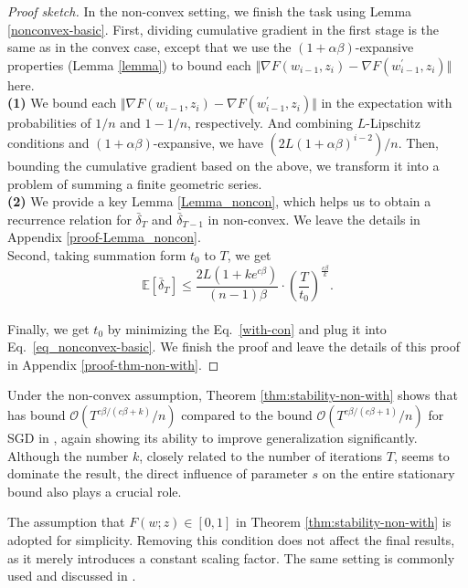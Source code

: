 \begin{proof}[Proof sketch]
In the non-convex setting, we finish the task using Lemma \ref{nonconvex-basic}. First, dividing cumulative gradient in the first stage is the same as in the convex case, except that we use the $(1+\alpha\beta)$-expansive properties (Lemma \ref{lemma}) to bound each $\Vert \nabla F(w_{i-1},z_{i}) - \nabla F(w^{\prime}_{i-1},z_{i}) \Vert$ here. \\
{\bf(1)} We bound each $\Vert \nabla F(w_{i-1},z_{i}) - \nabla F(w^{\prime}_{i-1},z_{i}) \Vert$ in the expectation with probabilities of $1/n$ and $1-1/n$, respectively. And combining $L$-Lipschitz conditions and $(1+\alpha\beta)$-expansive, we have $(2L(1+\alpha\beta)^{i-2})/n$. Then, bounding the cumulative gradient based on the above, we transform it into a problem of summing a finite geometric series. \\
{\bf(2)} We provide a key Lemma \ref{Lemma_noncon}, which helps us to obtain a recurrence relation for $\bar{\delta}_T$ and $\bar{\delta}_{T-1}$ in non-convex. We leave the details in Appendix \ref{proof-Lemma_noncon}. \\
Second, taking summation form $t_0$ to $T$, we get 
\begin{equation*}
 \mathbb{E}\left[\bar{\delta}_{T}\right] \leq \frac{2L(1+ke^{c\beta})}{(n-1)\beta} \cdot \left(\frac{T}{t_0}\right)^{\frac{c\beta}{k}}.   
\end{equation*} \\
Finally, we get $t_0$ by minimizing the Eq.~\eqref{with-con} and plug it into Eq.~\eqref{eq_nonconvex-basic}. We finish the proof and leave the details of this proof in Appendix \ref{proof-thm-non-with}.
\end{proof}

\begin{remark}
Under the non-convex assumption, Theorem \ref{thm:stability-non-with} shows that \method{} has bound $\mathcal{O}(T^{c\beta/(c\beta+k)}/n)$ compared to the bound $\mathcal{O}(T^{c\beta/(c\beta+1)}/n)$ for SGD in \citet{hardt2016train}, again showing its ability to improve generalization significantly. Although the number $k$, closely related to the number of iterations $T$, seems to dominate the result, the direct influence of parameter $s$ on the entire stationary bound also plays a crucial role. 
\end{remark}

\begin{remark}
The assumption that $F(w;z) \in [0,1]$ in Theorem \ref{thm:stability-non-with} is adopted for simplicity. Removing this condition does not affect the final results, as it merely introduces a constant scaling factor. The same setting is commonly used and discussed in \citet{hardt2016train,xiao2022stability}. 
\end{remark}

